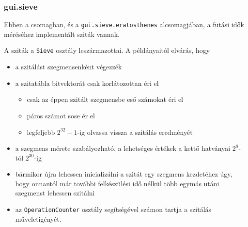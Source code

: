 \subsubsection{gui.sieve}

Ebben a csomagban, és a \texttt{gui.sieve.eratosthenes} alcsomagjában, a futási idők méréséhez implementált sziták vannak.

A sziták a \texttt{Sieve} osztály leszármazottai.
A példányaitól elvárás, hogy
\begin{itemize}
\item a szitálást szegmensenként végezzék
\item a szitatábla bitvektorát csak korlátozottan éri el
\begin{itemize}
\item csak az éppen szitált szegmensbe eső számokat éri el
\item páros számot sose ér el
\item legfeljebb $2^{32}-1$-ig olvassa vissza a szitálás eredményét
\end{itemize}
\item a szegmens mérete szabályozható, a lehetséges értékek a kettő hatványai $2^8$-tól $2^{30}$-ig 
\item bármikor újra lehessen inicializálni a szitát egy szegmens kezdetéhez úgy, hogy onnantól már további felkészülési idő nélkül több egymás utáni szegmenst lehessen szitálni
\item az \texttt{OperationCounter} osztály segítségével számon tartja a szitálás műveletigényét.
\end{itemize}

